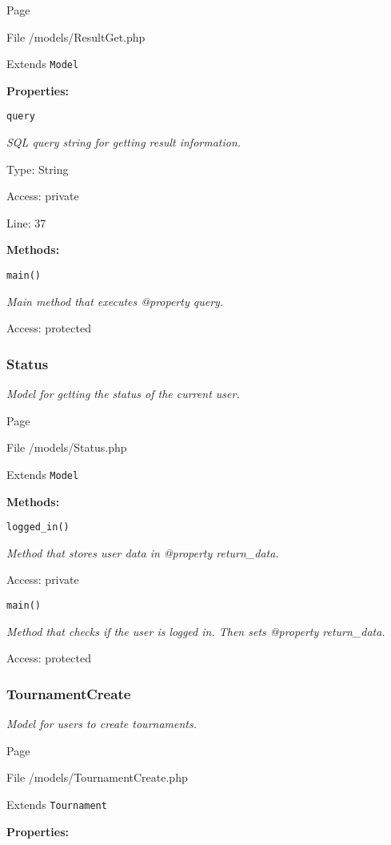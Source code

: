 Page \pageref{ResultGet.php}

File /models/ResultGet.php

Extends \texttt{Model}

\textbf{Properties:}

\texttt{query}

{\scriptsize
\textit{SQL query string for getting result information.}

Type: String

Access: private

Line: 37

}
\textbf{Methods:}

\texttt{main()}

{\scriptsize
\textit{Main method that executes @property query.}

Access: protected

}

\subsubsection{Status}
\textit{Model for getting the status of the current user.}

Page \pageref{Status.php}

File /models/Status.php

Extends \texttt{Model}

\textbf{Methods:}

\texttt{logged\_in()}

{\scriptsize
\textit{Method that stores user data in @property return\_data.}

Access: private

}

\texttt{main()}

{\scriptsize
\textit{Method that checks if the user is logged in.
Then sets @property return\_data.}

Access: protected

}

\subsubsection{TournamentCreate}
\textit{Model for users to create tournaments.}

Page \pageref{TournamentCreate.php}

File /models/TournamentCreate.php

Extends \texttt{Tournament}

\textbf{Properties:}

